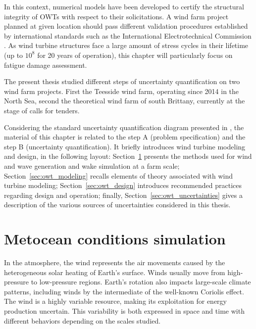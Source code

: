 In this context, numerical models have been developed to certify the structural integrity of OWTs with respect to their solicitations. 
A wind farm project planned at given location should pass different validation procedures established by international standards such as the International Electrotechnical Commission \citep{iec_2019}. 
As wind turbine structures face a large amount of stress cycles in their lifetime (up to $10^8$ for 20 years of operation), this chapter will particularly focus on fatigue damage assessment.

The present thesis studied different steps of uncertainty quantification on two wind farm projects. 
First the Teesside wind farm, operating since 2014 in the North Sea, second the theoretical wind farm of south Brittany, currently at the stage of calls for tenders.

Considering the standard uncertainty quantification diagram presented in , the material of this chapter is related to the step A (problem specification) and the step B (uncertainty quantification). 
It briefly introduces wind turbine modeling and design, in the following layout: 
Section~\ref{sec:metocean_simulation} presents the methods used for wind and wave generation and wake simulation at a farm scale; 
Section~\ref{sec:owt_modeling} recalls elements of theory associated with wind turbine modeling; 
Section~\ref{sec:owt_design} introduces recommended practices regarding design and operation; 
finally, Section~\ref{sec:owt_uncertainties} gives a description of the various sources of uncertainties considered in this thesis. 



\section{Metocean conditions simulation} \label{sec:metocean_simulation}

In the atmosphere, the wind represents the air movements caused by the heterogeneous solar heating of Earth's surface. 
Winds usually move from high-pressure to low-pressure regions. 
Earth's rotation also impacts large-scale climate patterns, including winds by the intermediate of the well-known Coriolis effect. 
The wind is a highly variable resource, making its exploitation for energy production uncertain. 
This variability is both expressed in space and time with different behaviors depending on the scales studied. 

